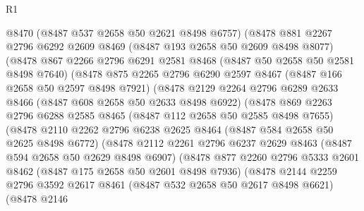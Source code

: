 \begin{lexlean}{R1}
\begin{coremodule}
              @8470
              (@8487 @537 @2658 @50 @2621 @8498 @6757)
              (@8478
                @881
                @2267
                @2796
                @6292
                @2609
                @8469
                (@8487 @193 @2658 @50 @2609 @8498 @8077)
                (@8478
                  @867
                  @2266
                  @2796
                  @6291
                  @2581
                  @8468
                  (@8487 @50 @2658 @50 @2581 @8498 @7640)
                  (@8478
                    @875
                    @2265
                    @2796
                    @6290
                    @2597
                    @8467
                    (@8487 @166 @2658 @50 @2597 @8498 @7921)
                    (@8478
                      @2129
                      @2264
                      @2796
                      @6289
                      @2633
                      @8466
                      (@8487 @608 @2658 @50 @2633 @8498 @6922)
                      (@8478
                        @869
                        @2263
                        @2796
                        @6288
                        @2585
                        @8465
                        (@8487 @112 @2658 @50 @2585 @8498 @7655)
                        (@8478
                          @2110
                          @2262
                          @2796
                          @6238
                          @2625
                          @8464
                          (@8487 @584 @2658 @50 @2625 @8498 @6772)
                          (@8478
                            @2112
                            @2261
                            @2796
                            @6237
                            @2629
                            @8463
                            (@8487 @594 @2658 @50 @2629 @8498 @6907)
                            (@8478
                              @877
                              @2260
                              @2796
                              @5333
                              @2601
                              @8462
                              (@8487 @175 @2658 @50 @2601 @8498 @7936)
                              (@8478
                                @2144
                                @2259
                                @2796
                                @3592
                                @2617
                                @8461
                                (@8487 @532 @2658 @50 @2617 @8498 @6621)
                                (@8478
                                  @2146

\end{coremodule}
\end{lexlean}

